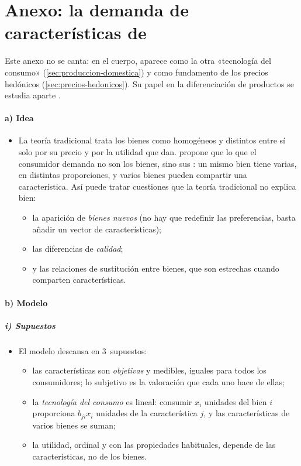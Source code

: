 \documentclass[11pt]{article}
\begin{document}
\section{Anexo: la demanda de características de }\label{anexo:lancaster}

\begin{notaopositor}
Este anexo no se canta: en el cuerpo,  aparece como la otra «tecnología del consumo» (\ref{sec:produccion-domestica}) y como fundamento de los precios hedónicos (\ref{sec:precios-hedonicos}). Su papel en la diferenciación de productos se estudia aparte .
\end{notaopositor}

\paragraph{a) Idea}

\begin{itemize}
\item La teoría tradicional trata los bienes como homogéneos y distintos entre sí solo por su precio y por la utilidad que dan. \textcite{Lancaster1966New} propone que lo que el consumidor demanda no son los bienes, sino sus : un mismo bien tiene varias, en distintas proporciones, y varios bienes pueden compartir una característica. Así puede tratar cuestiones que la teoría tradicional no explica bien:
  \begin{itemize}
  \item la aparición de \emph{bienes nuevos} (no hay que redefinir las preferencias, basta añadir un vector de características);
  \item las diferencias de \emph{calidad};
  \item y las relaciones de sustitución entre bienes, que son estrechas cuando comparten características.
  \end{itemize}
\end{itemize}

\paragraph{b) Modelo}

\subparagraph{i) Supuestos}

\begin{itemize}
\item El modelo descansa en 3~supuestos:
\begin{itemize}
\item las características son \emph{objetivas} y medibles, iguales para todos los consumidores; lo subjetivo es la valoración que cada uno hace de ellas;
\item la \emph{tecnología del consumo} es lineal: consumir $x_i$ unidades del bien $i$ proporciona $b_{ji}x_i$ unidades de la característica $j$, y las características de varios bienes se suman;
\item la utilidad, ordinal y con las propiedades habituales, depende de las características, no de los bienes.
\end{itemize}
\end{itemize}
\end{document}
